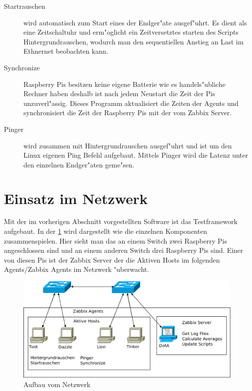 \begin{enumerate}
\begin{description}
\item[Startrauschen]wird automatisch zum Start eines der Endger"ate ausgef"uhrt. Es dient als eine Zeitschaltuhr %
und erm"oglicht ein Zeitversetztes starten des Scripts Hintergrundrauschen, wodurch man den sequentiellen %
Anstieg an Last im Ethnernet beobachten kann.

\item[Synchronize] Raspberry Pis besitzen keine eigene Batterie wie es handels"ubliche Rechner haben %
deshalb ist nach jedem Neustart die Zeit der Pis unzuverl"assig. Dieses Programm aktualisiert %
die Zeiten der Agents und synchronisiert die Zeit der Raspberry Pis mit der vom Zabbix Server. %

\item[Pinger]wird zusammen mit Hintergrundrauschen ausgef"uhrt und ist um den Linux eigenen Ping Befehl %
aufgebaut. Mittels Pinger wird die Latenz unter den einzelnen Endger"aten geme"sen. %
\end{description}
\end{enumerate}
\section{Einsatz im Netzwerk} 

Mit der im vorherigen Abschnitt vorgestellten Software ist das Testframework aufgebaut. In der \cref{fig:AufbauVomNetzwerk} %
wird dargestellt wie die einzelnen Komponenten zusammenspielen. Hier sieht man das an einem Switch zwei Raspberry Pis %
angeschlossen sind und an einem anderen Switch drei Raspberry Pis sind. Einer von diesen Pis ist der Zabbix Server der %
die Aktiven Hosts im folgenden Agents/Zabbix Agents im Netzwerk "uberwacht. 

\label{sec:einsatzImNetzwerk}
\begin{figure}[htbp]
\centering
\includegraphics*[width=0.9\linewidth]{Abb/Netzschaltung3}

\caption{Aufbau vom Netzwerk}
\label{fig:AufbauVomNetzwerk}
\end{figure}














